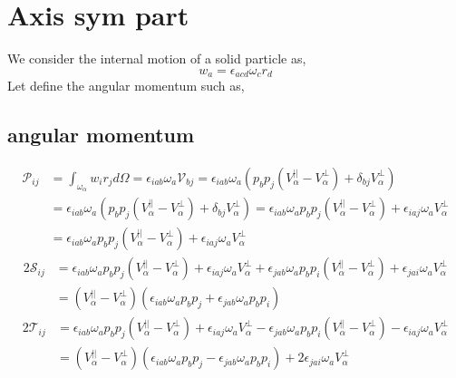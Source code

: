 \section{Axis sym part}


We consider the internal motion of a solid particle as, 
\begin{equation*}
    w_a = \epsilon_{acd} \omega_c r_d
\end{equation*}
Let define the angular momentum such as, 
\subsection{angular momentum}
\begin{align*}
    \mathcal{P}_{ij}
    &= \int_{\omega_\alpha} w_{i} r_j d\Omega
    =  \epsilon_{iab} \omega_a \mathcal{V}_{bj} 
    =  \epsilon_{iab} \omega_a ( p_bp_j (V_\alpha^{||} - V_\alpha^\bot) + \delta_{bj} V_\alpha^\bot)\\
    &=  \epsilon_{iab} \omega_a 
    ( p_bp_j (V_\alpha^{||} - V_\alpha^\bot) + \delta_{bj} V_\alpha^\bot)
    =  \epsilon_{iab} \omega_a 
    p_bp_j (V_\alpha^{||} - V_\alpha^\bot) 
    + \epsilon_{iaj} \omega_a V_\alpha^\bot\\
    &=  \epsilon_{iab} \omega_a 
    p_bp_j (V_\alpha^{||} - V_\alpha^\bot) 
    + \epsilon_{iaj} \omega_a V_\alpha^\bot
\end{align*}
\begin{align*}
    2 \mathcal{S}_{ij}
    &=  \epsilon_{iab} \omega_a 
    p_bp_j (V_\alpha^{||} - V_\alpha^\bot) 
    + \epsilon_{iaj} \omega_a V_\alpha^\bot
    +  \epsilon_{jab} \omega_a 
    p_bp_i (V_\alpha^{||} - V_\alpha^\bot) 
    + \epsilon_{jai} \omega_a V_\alpha^\bot\\
    &= (V_\alpha^{||} - V_\alpha^\bot) \left(
        \epsilon_{iab} \omega_a 
        p_bp_j 
        +  \epsilon_{jab} \omega_a 
        p_bp_i 
    \right)
\end{align*}
\begin{align*}
    2 \mathcal{T}_{ij}
    &=  \epsilon_{iab} \omega_a 
    p_bp_j (V_\alpha^{||} - V_\alpha^\bot) 
    + \epsilon_{iaj} \omega_a V_\alpha^\bot
    -  \epsilon_{jab} \omega_a 
    p_bp_i (V_\alpha^{||} - V_\alpha^\bot) 
    - \epsilon_{iaj} \omega_a V_\alpha^\bot\\
    &= (V_\alpha^{||} - V_\alpha^\bot) \left(
        \epsilon_{iab} \omega_a p_bp_j 
        -  \epsilon_{jab} \omega_a p_bp_i 
        \right)
    + 2\epsilon_{jai} \omega_a V_\alpha^\bot\\
\end{align*}

